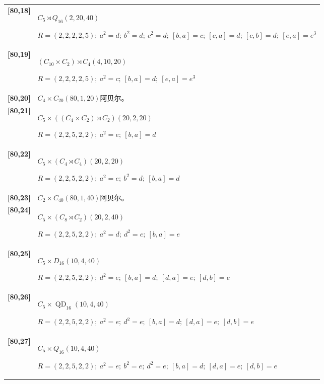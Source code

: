 \documentclass[UTF8,fontset=fandol,11pt,a4paper]{ctexart}
\begin{document}
\begin{longtable}{@{}p{17mm}>{\raggedright\arraybackslash}p{141mm}@{}}
\textbf{[80,18]} & $C_{5}\rtimes Q_{16}$\quad $(2,20,40)$\par\(R=(2,2,2,2,5);\allowbreak\ a^{2}=d;\allowbreak\ b^{2}=d;\allowbreak\ c^{2}=d;\allowbreak\ [b,a]=c;\allowbreak\ [c,a]=d;\allowbreak\ [c,b]=d;\allowbreak\ [e,a]=e^{3}\)\\[3pt]

\textbf{[80,19]} & $(C_{10}\times C_{2})\rtimes C_{4}$\quad $(4,10,20)$\par\(R=(2,2,2,2,5);\allowbreak\ a^{2}=c;\allowbreak\ [b,a]=d;\allowbreak\ [e,a]=e^{3}\)\\[3pt]

\textbf{[80,20]} & $C_{4}\times C_{20}$\quad $(80,1,20)$\quad 阿贝尔。\\[3pt]

\textbf{[80,21]} & $C_{5}\times ((C_{4}\times C_{2})\rtimes C_{2})$\quad $(20,2,20)$\par\(R=(2,2,5,2,2);\allowbreak\ a^{2}=e;\allowbreak\ [b,a]=d\)\\[3pt]

\textbf{[80,22]} & $C_{5}\times (C_{4}\rtimes C_{4})$\quad $(20,2,20)$\par\(R=(2,2,5,2,2);\allowbreak\ a^{2}=e;\allowbreak\ b^{2}=d;\allowbreak\ [b,a]=d\)\\[3pt]

\textbf{[80,23]} & $C_{2}\times C_{40}$\quad $(80,1,40)$\quad 阿贝尔。\\[3pt]

\textbf{[80,24]} & $C_{5}\times (C_{8}\rtimes C_{2})$\quad $(20,2,40)$\par\(R=(2,2,5,2,2);\allowbreak\ a^{2}=d;\allowbreak\ d^{2}=e;\allowbreak\ [b,a]=e\)\\[3pt]

\textbf{[80,25]} & $C_{5}\times D_{16}$\quad $(10,4,40)$\par\(R=(2,2,5,2,2);\allowbreak\ d^{2}=e;\allowbreak\ [b,a]=d;\allowbreak\ [d,a]=e;\allowbreak\ [d,b]=e\)\\[3pt]

\textbf{[80,26]} & $C_{5}\times \operatorname{QD}_{16}$\quad $(10,4,40)$\par\(R=(2,2,5,2,2);\allowbreak\ a^{2}=e;\allowbreak\ d^{2}=e;\allowbreak\ [b,a]=d;\allowbreak\ [d,a]=e;\allowbreak\ [d,b]=e\)\\[3pt]

\textbf{[80,27]} & $C_{5}\times Q_{16}$\quad $(10,4,40)$\par\(R=(2,2,5,2,2);\allowbreak\ a^{2}=e;\allowbreak\ b^{2}=e;\allowbreak\ d^{2}=e;\allowbreak\ [b,a]=d;\allowbreak\ [d,a]=e;\allowbreak\ [d,b]=e\)\\[3pt]


\end{longtable}
\end{document}
